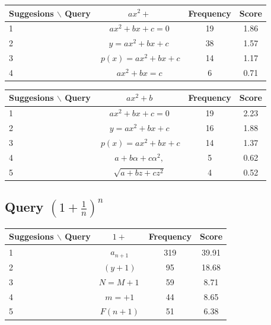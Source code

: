 \documentclass[12pt]{article} %
\begin{document}
\begin{center}
\begin{tabular}{lccc}
Suggesions $\backslash$ Query  & $ ax^2 + $ & Frequency & Score \\
\hline
 1 &  $ ax^{2}+bx+c=0 $ & 19 & 1.86 \\
 2 &  $ y=ax^{2}+bx+c\, $ & 38 & 1.57 \\
 3 &  $ \ p(x)=ax^{2}+bx+c $ & 14 & 1.17 \\
 4 &  $ ax^{2}+bx=c $ & 6 & 0.71 \\
\end{tabular}
\end{center}

\begin{center}
\begin{tabular}{lccc}
Suggesions $\backslash$ Query  & $ ax^2 + b $ & Frequency & Score \\
\hline
 1 &  $ ax^{2}+bx+c=0 $ & 19 & 2.23 \\
 2 &  $ y=ax^{2}+bx+c $ & 16 & 1.88 \\
 3 &  $ \ p(x)=ax^{2}+bx+c $ & 14 & 1.37 \\
 4 &  $ a+b\alpha+c\alpha^{2}, $ & 5 & 0.62 \\
 5 &  $ \sqrt{a+bz+cz^{2}} $ & 4 & 0.52 \\
\end{tabular}
\end{center}


\subsection{Query $(1+ \frac 1 n)^n$}

\begin{center}
\begin{tabular}{lccc}
Suggesions $\backslash$ Query  & $ 1+ $ & Frequency & Score \\
\hline
 1 &  $ \displaystyle a_{n+1} $ & 319 & 39.91 \\
 2 &  $ (y+1) $ & 95 & 18.68 \\
 3 &  $ N=M+1\, $ & 59 & 8.71 \\
 4 &  $ m=+1 $ & 44 & 8.65 \\
 5 &  $ F(n+1) $ & 51 & 6.38 \\
\end{tabular}
\end{center}
\end{document}
